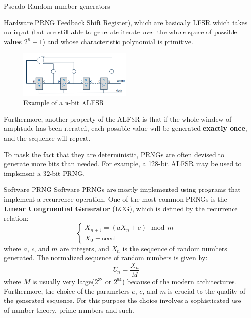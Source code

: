 \begin{section}{Pseudo-Random number generators}
\begin{subsection}{Hardware PRNG}
    Feedback Shift Register), which are basically LFSR which takes no input (but are still able to 
    generate iterate over the whole space of possible values $2^n-1$) and whose characteristic
    polynomial is primitive.
    \begin{figure}[H]
      \centering
      \includegraphics[width=0.5\textwidth]{img/hardware/ALFSR.png}
      \caption{Example of a n-bit ALFSR}
    \end{figure}
    Furthermore, another property of the ALFSR is that if the whole window of amplitude has been
    iterated, each possible value will be generated \textbf{exactly once}, and the sequence will
    repeat.
    \begin{boxH}
      To mask the fact that they are deterministic, PRNGs are often devised to generate more bits
      than needed. For example, a 128-bit ALFSR may be used to implement a 32-bit PRNG.
    \end{boxH}
  \end{subsection}
  \begin{subsection}{Software PRNG}
    Software PRNGs are mostly implemented using programs that implement a recurrence operation.
    One of the most common PRNGs is the \textbf{Linear Congruential Generator} (LCG), which is
    defined by the recurrence relation:
    \begin{equation}
      \begin{cases}
        X_{n+1} = (aX_n + c) \mod m\\
        X_0 = \text{seed}
      \end{cases}
    \end{equation}
    where $a$, $c$, and $m$ are integers, and $X_n$ is the sequence of random numbers generated.
    The normalized sequence of random numbers is given by:
    \begin{equation}
      U_n = \frac{X_n}{M}
    \end{equation}
    where $M$ is usually very large($2^{32}$ or $2^{64}$) because of the modern architectures.\\
    Furthermore, the choice of the parameters $a$, $c$, and $m$ is crucial to the quality of the
    generated sequence. For this purpose the choice involves a sophisticated use of number theory,
    prime numbers and such.
  \end{subsection}


\end{section}
